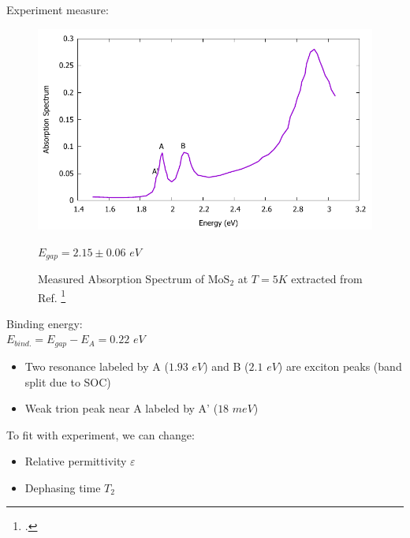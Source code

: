 \documentclass{beamer}
\begin{document}
	\begin{frame}
		Experiment measure:
		\begin{multicols}{2}
		\begin{figure}
	\includegraphics[width = 1\linewidth]{images/Experiment.pdf}
	\caption{Measured Absorption Spectrum of $\mathrm{MoS}_2$ at $T=5K$  extracted from Ref.  \footcite{zhang_absorption_2014}} $E_{gap} = 2.15 \pm 0.06$ \(eV\)
	\end{figure}
Binding energy: \\
	$E_{bind.} = E_{gap} - E_{A} = 0.22$ \(eV\)
 \columnbreak
	\begin{itemize}
		\item Two resonance labeled by A ($1.93$ \(eV\)) and B ($2.1$ \(eV\)) are exciton peaks (band split due to SOC)
		\item Weak trion peak near A labeled by A' ($18$ \(meV\))
	\end{itemize}
To fit with experiment, we can change:
\begin{itemize}
\item Relative permittivity $\varepsilon$
\item Dephasing time $T_2$
\end{itemize}
	\end{multicols}
	\end{frame}
\end{document}
